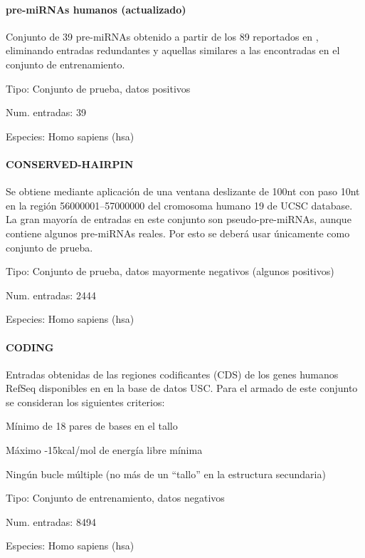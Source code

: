 \documentclass[12pt,bibliography=oldstyle,DIV=12,parskip=half-]{scrartcl}
\begin{document}
\paragraph{pre-miRNAs humanos (actualizado)}
Conjunto de 39 pre-miRNAs obtenido a partir de los 89 reportados en
\cite{bentwich}, eliminando entradas redundantes y aquellas similares
a las encontradas en el conjunto de entrenamiento.
\begin{description*}
\item[Tipo:] Conjunto de prueba, datos positivos
\item[Num. entradas:] 39
\item[Especies:]  Homo sapiens (hsa)
\end{description*}

\bigskip


\paragraph{CONSERVED-HAIRPIN}
Se obtiene mediante aplicación de una ventana deslizante de 100nt con
paso 10nt en la región 56000001--57000000 del cromosoma humano 19 de
UCSC database. La gran mayoría de entradas en este conjunto son
pseudo-pre-miRNAs, aunque contiene algunos pre-miRNAs reales.  Por
esto se deberá usar únicamente como conjunto de prueba.
\begin{description*}
\item[Tipo:] Conjunto de prueba, datos mayormente negativos (algunos
  positivos)
\item[Num. entradas:] 2444
\item[Especies:]  Homo sapiens (hsa)
\end{description*}
\paragraph{CODING}
Entradas obtenidas de las regiones codificantes (CDS) de los genes
humanos RefSeq disponibles en en la base de datos USC.  Para
el armado de este conjunto se consideran los siguientes criterios:
\begin{itemize*}
\item Mínimo de 18 pares de bases en el tallo
\item Máximo -15kcal/mol de energía libre mínima
\item Ningún bucle múltiple (no más de un ``tallo'' en la estructura
  secundaria)
\end{itemize*}
\begin{description*}
\item[Tipo:] Conjunto de entrenamiento, datos negativos
\item[Num. entradas:] 8494
\item[Especies:]  Homo sapiens (hsa)
\end{description*}
%
%
%
%
%
\end{document}
